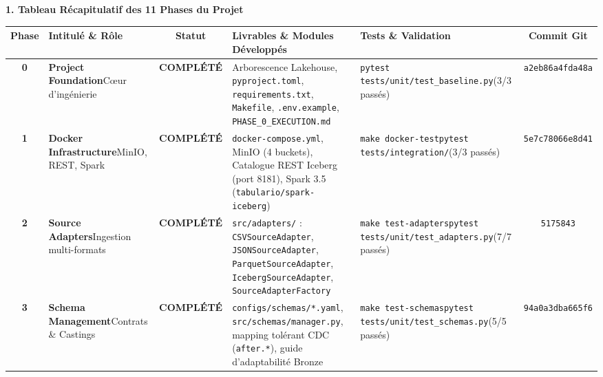 \documentclass[9pt,a4paper,landscape]{article}
\begin{document}
\vspace{0.15cm}

\noindent
\textbf{\small \color{primary}1. Tableau Récapitulatif des 11 Phases du Projet}

\vspace{0.08cm}

\fontsize{7.5pt}{9.2pt}\selectfont
\noindent
\begin{tabularx}{\textwidth}{c p{3.2cm} c p{8.6cm} p{5.6cm} c}
\toprule
\rowcolor{headerbg}
\textbf{Phase} & \textbf{Intitulé \& Rôle} & \textbf{Statut} & \textbf{Livrables \& Modules Développés} & \textbf{Tests \& Validation} & \textbf{Commit Git} \\
\midrule
\textbf{0} & \textbf{Project Foundation}\newline Cœur d'ingénierie & \cellcolor{successbg}\color{successtext}\textbf{COMPLÉTÉ} & Arborescence Lakehouse, \texttt{pyproject.toml}, \texttt{requirements.txt}, \texttt{Makefile}, \texttt{.env.example}, \texttt{PHASE\_0\_EXECUTION.md} & \texttt{pytest tests/unit/test\_baseline.py}\newline(3/3 passés) & \texttt{a2eb86a}\newline\texttt{4fda48a} \\
\midrule
\textbf{1} & \textbf{Docker Infrastructure}\newline MinIO, REST, Spark & \cellcolor{successbg}\color{successtext}\textbf{COMPLÉTÉ} & \texttt{docker-compose.yml}, MinIO (4 buckets), Catalogue REST Iceberg (port 8181), Spark 3.5 (\texttt{tabulario/spark-iceberg}) & \texttt{make docker-test}\newline\texttt{pytest tests/integration/}\newline(3/3 passés) & \texttt{5e7c780}\newline\texttt{66e8d41} \\
\midrule
\textbf{2} & \textbf{Source Adapters}\newline Ingestion multi-formats & \cellcolor{successbg}\color{successtext}\textbf{COMPLÉTÉ} & \texttt{src/adapters/} : \texttt{CSVSourceAdapter}, \texttt{JSONSourceAdapter}, \texttt{ParquetSourceAdapter}, \texttt{IcebergSourceAdapter}, \texttt{SourceAdapterFactory} & \texttt{make test-adapters}\newline\texttt{pytest tests/unit/test\_adapters.py}\newline(7/7 passés) & \texttt{5175843} \\
\midrule
\textbf{3} & \textbf{Schema Management}\newline Contrats \& Castings & \cellcolor{successbg}\color{successtext}\textbf{COMPLÉTÉ} & \texttt{configs/schemas/*.yaml}, \texttt{src/schemas/manager.py}, mapping tolérant CDC (\texttt{after.*}), guide d'adaptabilité Bronze & \texttt{make test-schemas}\newline\texttt{pytest tests/unit/test\_schemas.py}\newline(5/5 passés) & \texttt{94a0a3d}\newline\texttt{ba665f6} \\

\end{tabularx}
\end{document}
